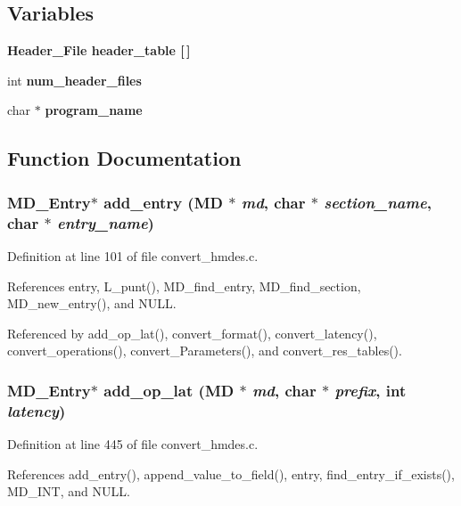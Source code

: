 \subsection*{Variables}
\begin{CompactItemize}
\item 
\bf{Header\_\-File} \bf{header\_\-table} [$\,$]
\item 
int \bf{num\_\-header\_\-files}
\item 
char $\ast$ \bf{program\_\-name}
\end{CompactItemize}


\subsection{Function Documentation}
\subsubsection{\setlength{\rightskip}{0pt plus 5cm}\bf{MD\_\-Entry}$\ast$ add\_\-entry (\bf{MD} $\ast$ {\em md}, char $\ast$ {\em section\_\-name}, char $\ast$ {\em entry\_\-name})}\label{convert__hmdes_8c_06be49cfc7f58ccb3e02f1e051feb60e}




Definition at line 101 of file convert\_\-hmdes.c.

References entry, L\_\-punt(), MD\_\-find\_\-entry, MD\_\-find\_\-section, MD\_\-new\_\-entry(), and NULL.

Referenced by add\_\-op\_\-lat(), convert\_\-format(), convert\_\-latency(), convert\_\-operations(), convert\_\-Parameters(), and convert\_\-res\_\-tables().
\subsubsection{\setlength{\rightskip}{0pt plus 5cm}\bf{MD\_\-Entry}$\ast$ add\_\-op\_\-lat (\bf{MD} $\ast$ {\em md}, char $\ast$ {\em prefix}, int {\em latency})}\label{convert__hmdes_8c_2bf1f437337eda2962b935e0bc407b8b}




Definition at line 445 of file convert\_\-hmdes.c.

References add\_\-entry(), append\_\-value\_\-to\_\-field(), entry, find\_\-entry\_\-if\_\-exists(), MD\_\-INT, and NULL.

